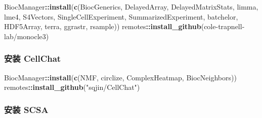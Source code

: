 \documentclass[
]{article}
\newenvironment{Shaded}{\begin{snugshade}}{\end{snugshade}}
\newcommand{\KeywordTok}[1]{\textcolor[rgb]{0.13,0.29,0.53}{\textbf{#1}}}
\newcommand{\NormalTok}[1]{#1}
\newcommand{\OperatorTok}[1]{\textcolor[rgb]{0.81,0.36,0.00}{\textbf{#1}}}
\newcommand{\StringTok}[1]{\textcolor[rgb]{0.31,0.60,0.02}{#1}}
\begin{document}
\begin{Shaded}
\begin{Highlighting}[]
\NormalTok{BiocManager}\OperatorTok{::}\KeywordTok{install}\NormalTok{(}\KeywordTok{c}\NormalTok{(}\StringTok{\textquotesingle{}BiocGenerics\textquotesingle{}}\NormalTok{, }\StringTok{\textquotesingle{}DelayedArray\textquotesingle{}}\NormalTok{, }\StringTok{\textquotesingle{}DelayedMatrixStats\textquotesingle{}}\NormalTok{,}
    \StringTok{\textquotesingle{}limma\textquotesingle{}}\NormalTok{, }\StringTok{\textquotesingle{}lme4\textquotesingle{}}\NormalTok{, }\StringTok{\textquotesingle{}S4Vectors\textquotesingle{}}\NormalTok{, }\StringTok{\textquotesingle{}SingleCellExperiment\textquotesingle{}}\NormalTok{,}
    \StringTok{\textquotesingle{}SummarizedExperiment\textquotesingle{}}\NormalTok{, }\StringTok{\textquotesingle{}batchelor\textquotesingle{}}\NormalTok{, }\StringTok{\textquotesingle{}HDF5Array\textquotesingle{}}\NormalTok{,}
    \StringTok{\textquotesingle{}terra\textquotesingle{}}\NormalTok{, }\StringTok{\textquotesingle{}ggrastr\textquotesingle{}}\NormalTok{, }\StringTok{\textquotesingle{}rsample\textquotesingle{}}\NormalTok{))}
\NormalTok{remotes}\OperatorTok{::}\KeywordTok{install\_github}\NormalTok{(}\StringTok{\textquotesingle{}cole{-}trapnell{-}lab/monocle3\textquotesingle{}}\NormalTok{)}
\end{Highlighting}
\end{Shaded}

\hypertarget{ux5b89ux88c5-cellchat}{%
\subsubsection{安装 CellChat}\label{ux5b89ux88c5-cellchat}}

\begin{Shaded}
\begin{Highlighting}[]
\NormalTok{BiocManager}\OperatorTok{::}\KeywordTok{install}\NormalTok{(}\KeywordTok{c}\NormalTok{(}\StringTok{\textquotesingle{}NMF\textquotesingle{}}\NormalTok{, }\StringTok{\textquotesingle{}circlize\textquotesingle{}}\NormalTok{, }\StringTok{\textquotesingle{}ComplexHeatmap\textquotesingle{}}\NormalTok{, }\StringTok{\textquotesingle{}BiocNeighbors\textquotesingle{}}\NormalTok{))}
\NormalTok{remotes}\OperatorTok{::}\KeywordTok{install\_github}\NormalTok{(}\StringTok{"sqjin/CellChat"}\NormalTok{)}
\end{Highlighting}
\end{Shaded}

\hypertarget{ux5b89ux88c5-scsa}{%
\subsubsection{安装 SCSA}\label{ux5b89ux88c5-scsa}}
\end{document}
